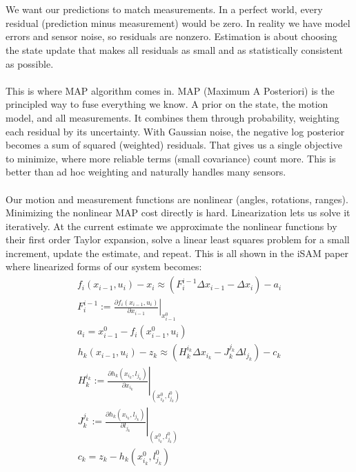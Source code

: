\\ \\
We want our predictions to match measurements. In a perfect world, every residual (prediction minus measurement) would be zero. In reality we have model errors and sensor noise, so residuals are nonzero. Estimation is about choosing the state update that makes all residuals as small and as statistically consistent as possible.
\\ \\
This is where \gls{MAP} algorithm comes in. \gls{MAP} (Maximum A Posteriori) is the principled way to fuse everything we know. A prior on the state, the motion model, and all measurements. It combines them through probability, weighting each residual by its uncertainty. With Gaussian noise, the negative log posterior becomes a sum of squared (weighted) residuals. That gives us a single objective to minimize, where more reliable terms (small covariance) count more. This is better than ad hoc weighting and naturally handles many sensors.
\\ \\
Our motion and measurement functions are nonlinear (angles, rotations, ranges). Minimizing the nonlinear \gls{MAP} cost directly is hard. Linearization lets us solve it iteratively. At the current estimate we approximate the nonlinear functions by their first order Taylor expansion, solve a linear least squares problem for a small increment, update the estimate, and repeat. This is all shown in the \gls{iSAM} paper \cite{iSAM_paper} where linearized forms of our system becomes:
\begin{equation}
    \begin{aligned}
        f_{i}(x_{i-1}, u_i) - x_i \approx (F_{i}^{i-1}\Delta x_{i-1} - \Delta x_{i}) - a_i \\
        \left.F_{i}^{i-1} := \frac{\partial f_{i}(x_{i-1}, u_i)}{\partial x_{i-1}}\right|_{x_{i-1}^{0}} \\ 
        a_i = x_{i-1}^{0} - f_{i}(x_{i-1}^{0}, u_i)
    \end{aligned}
    \label{eq:optimizer-iSAM-linearized-odometry}
\end{equation}
\begin{equation}
    \begin{aligned}
        h_{k}(x_{i-1}, u_i) - z_k \approx (H_{k}^{i_k}\Delta x_{i_k} - J_{k}^{j_k} \Delta l_{j_k}) - c_k \\
        \left.H_{k}^{i_k} := \frac{\partial h_{k}(x_{i_k}, l_{j_k})}{\partial x_{i_k}}\right|_{(x_{i_k}^{0}, l_{j_k}^{0})} \\ 
        \left.J_{k}^{j_k} := \frac{\partial h_{k}(x_{i_k}, l_{j_k})}{\partial l_{j_k}}\right|_{(x_{i_k}^{0}, l_{j_k}^{0})} \\ 
        c_k = z_{k} - h_{k}(x_{i_k}^{0}, l_{j_k}^{0})
    \end{aligned}
    \label{eq:optimizer-iSAM-linearized-measurement}
\end{equation}

